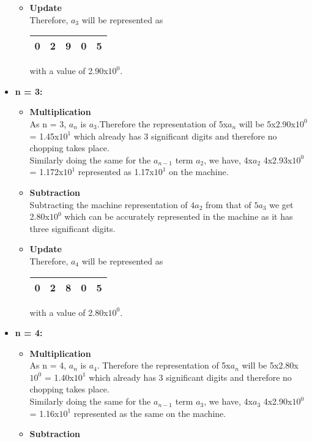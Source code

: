 \documentclass[letterpaper]{exam}
\begin{document}
\begin{questions}
\begin{parts}
\begin{solution}
\begin{itemize}
\begin{itemize}
\item \textbf{Update}\\
Therefore, $a_{3}$ will be represented as \begin{tabular}{|c|c|c|c|c|}
\hline
     \huge{\color{red}0}&\huge{\color{green}2}&\huge{\color{green}9}&\huge{\color{green}0}&\huge{\color{yellow}5}  \\[0.5ex]
\hline
\end{tabular} with a value of 2.90x$10^0$.
\end{itemize}
\item \textbf{n = 3:}
\begin{itemize}
\item \textbf{Multiplication}\\
As n = 3, $a_{n}$ is $a_{3}$.Therefore the representation of 5x$a_{n}$ will be 5x2.90x$10^0$ = 1.45x$10^1$ which already has 3 significant digits and therefore no chopping takes place.\\
Similarly doing the same for the $a_{n-1}$ term $a_{2}$, we have, 4x$a_{2}$ 4x2.93x$10^0$ = 1.172x$10^1$ represented as 1.17x$10^1$ on the machine.
\item \textbf{Subtraction}\\
Subtracting the machine representation of $4a_{2}$ from that of $5a_{3}$ we get 2.80x$10^0$ which can be accurately represented in the machine as it has three significant digits.
\item \textbf{Update}\\
Therefore, $a_{4}$ will be represented as \begin{tabular}{|c|c|c|c|c|}
\hline
     \huge{\color{red}0}&\huge{\color{green}2}&\huge{\color{green}8}&\huge{\color{green}0}&\huge{\color{yellow}5}  \\[0.5ex]
\hline
\end{tabular} with a value of 2.80x$10^0$.
\end{itemize}
\item \textbf{n = 4:}
\begin{itemize}
\item \textbf{Multiplication}\\
As n = 4, $a_{n}$ is $a_{4}$. Therefore the representation of 5x$a_{n}$ will be 5x2.80x$10^0$ = 1.40x$10^1$ which already has 3 significant digits and therefore no chopping takes place.\\
Similarly doing the same for the $a_{n-1}$ term $a_{3}$, we have, 4x$a_{3}$ 4x2.90x$10^0$ = 1.16x$10^1$ represented as the same on the machine.
\item \textbf{Subtraction}\\

\end{itemize}
\end{itemize}
\end{solution}
\end{parts}
\end{questions}
\end{document}
